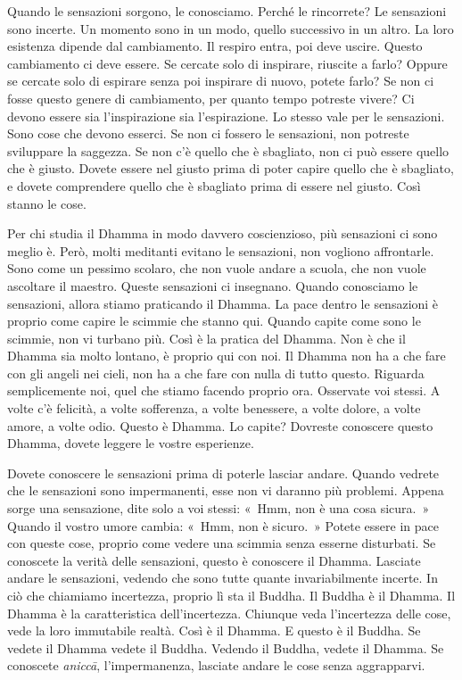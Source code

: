 Quando le sensazioni sorgono, le conosciamo. Perché le rincorrete? Le
sensazioni sono incerte. Un momento sono in un modo, quello successivo
in un altro. La loro esistenza dipende dal cambiamento. Il respiro
entra, poi deve uscire. Questo cambiamento ci deve essere. Se cercate
solo di inspirare, riuscite a farlo? Oppure se cercate solo di espirare
senza poi inspirare di nuovo, potete farlo? Se non ci fosse questo
genere di cambiamento, per quanto tempo potreste vivere? Ci devono
essere sia l'inspirazione sia l'espirazione. Lo stesso vale per le
sensazioni. Sono cose che devono esserci. Se non ci fossero le
sensazioni, non potreste sviluppare la saggezza. Se non c'è quello che è
sbagliato, non ci può essere quello che è giusto. Dovete essere nel
giusto prima di poter capire quello che è sbagliato, e dovete
comprendere quello che è sbagliato prima di essere nel giusto. Così
stanno le cose.

Per chi studia il Dhamma in modo davvero coscienzioso, più sensazioni ci
sono meglio è. Però, molti meditanti evitano le sensazioni, non vogliono
affrontarle. Sono come un pessimo scolaro, che non vuole andare a
scuola, che non vuole ascoltare il maestro. Queste sensazioni ci
insegnano. Quando conosciamo le sensazioni, allora stiamo praticando il
Dhamma. La pace dentro le sensazioni è proprio come capire le scimmie
che stanno qui. Quando capite come sono le scimmie, non vi turbano più.
Così è la pratica del Dhamma. Non è che il Dhamma sia molto lontano, è
proprio qui con noi. Il Dhamma non ha a che fare con gli angeli nei
cieli, non ha a che fare con nulla di tutto questo. Riguarda
semplicemente noi, quel che stiamo facendo proprio ora. Osservate voi
stessi. A volte c'è felicità, a volte sofferenza, a volte benessere, a
volte dolore, a volte amore, a volte odio. Questo è Dhamma. Lo capite?
Dovreste conoscere questo Dhamma, dovete leggere le vostre esperienze.

Dovete conoscere le sensazioni prima di poterle lasciar andare. Quando
vedrete che le sensazioni sono impermanenti, esse non vi daranno più
problemi. Appena sorge una sensazione, dite solo a voi stessi: «~Hmm,
non è una cosa sicura.~» Quando il vostro umore cambia: «~Hmm, non è
sicuro.~» Potete essere in pace con queste cose, proprio come vedere una
scimmia senza esserne disturbati. Se conoscete la verità delle
sensazioni, questo è conoscere il Dhamma. Lasciate andare le sensazioni,
vedendo che sono tutte quante invariabilmente incerte. In ciò che
chiamiamo incertezza, proprio lì sta il Buddha. Il Buddha è il Dhamma.
Il Dhamma è la caratteristica dell'incertezza. Chiunque veda
l'incertezza delle cose, vede la loro immutabile realtà. Così è il
Dhamma. E questo è il Buddha. Se vedete il Dhamma vedete il Buddha.
Vedendo il Buddha, vedete il Dhamma. Se conoscete \emph{aniccā},
l'impermanenza, lasciate andare le cose senza aggrapparvi.

